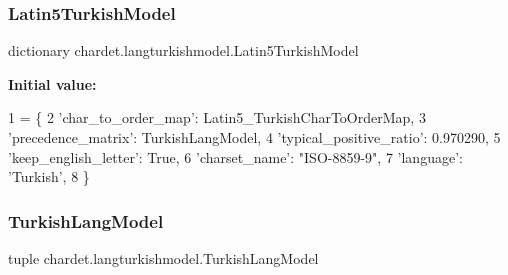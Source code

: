 \subsubsection{\texorpdfstring{Latin5\+Turkish\+Model}{Latin5TurkishModel}}
{\footnotesize\ttfamily dictionary chardet.\+langturkishmodel.\+Latin5\+Turkish\+Model}

{\bfseries Initial value\+:}
\begin{DoxyCode}
1 =  \{
2   \textcolor{stringliteral}{'char\_to\_order\_map'}: Latin5\_TurkishCharToOrderMap,
3   \textcolor{stringliteral}{'precedence\_matrix'}: TurkishLangModel,
4   \textcolor{stringliteral}{'typical\_positive\_ratio'}: 0.970290,
5   \textcolor{stringliteral}{'keep\_english\_letter'}: \textcolor{keyword}{True},
6   \textcolor{stringliteral}{'charset\_name'}: \textcolor{stringliteral}{"ISO-8859-9"},
7   \textcolor{stringliteral}{'language'}: \textcolor{stringliteral}{'Turkish'},
8 \}
\end{DoxyCode}
\mbox{\label{namespacechardet_1_1langturkishmodel_ad4193c6626570c45885edfa65ecf7be1}} 
\subsubsection{\texorpdfstring{Turkish\+Lang\+Model}{TurkishLangModel}}
{\footnotesize\ttfamily tuple chardet.\+langturkishmodel.\+Turkish\+Lang\+Model}

